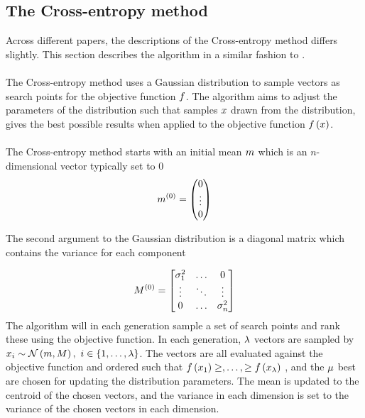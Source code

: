 \subsection{The Cross-entropy method \label{CrossEntropy}}
Across different papers, the descriptions of the Cross-entropy method 
differs slightly. This section
describes the algorithm in a similar fashion 
to \citep{scherrer2009}.\\
\\
The Cross-entropy method uses a Gaussian distribution to 
sample vectors as search points for the objective function
$f$. The algorithm aims to 
adjust the parameters of the distribution
such that samples $x$ drawn from the distribution,
gives the best possible results when applied to the
objective function $f \left( x \right)$.\\
\\
The Cross-entropy method starts with an initial 
mean $m$ which is an $n$-dimensional vector
typically set to 0
\begin{align}
m^{(0)} = \begin{pmatrix}
0\\
\vdots\\
0
\end{pmatrix} 
\end{align}

The second argument to the Gaussian distribution is a 
diagonal matrix which contains the variance for each 
component

\begin{align}
M^{(0)} =
\begin{bmatrix}
\sigma_1^{2} & \hdots & 0\\
\vdots & \ddots & \vdots\\
0 & \hdots & \sigma_{n}^{2}
\end{bmatrix}
\end{align}
The algorithm will in each generation sample a set of search points
and rank these using the objective function.
In each generation, $\lambda$ vectors are sampled by 
$x_{i} \sim \mathcal{N} \left(m, M \right)
,\ i \in \{1,\dots,\lambda \}$. The vectors are all evaluated 
against the objective function and ordered such that $f \left( x_{1} \right) \geq, \dots, \geq f \left( x_{\lambda} \right)$
, and the $\mu$ best are chosen for updating the distribution 
parameters. The mean is updated to the centroid of the chosen vectors, and
the variance in each dimension is set to the variance of the chosen vectors in each 
dimension.\\

